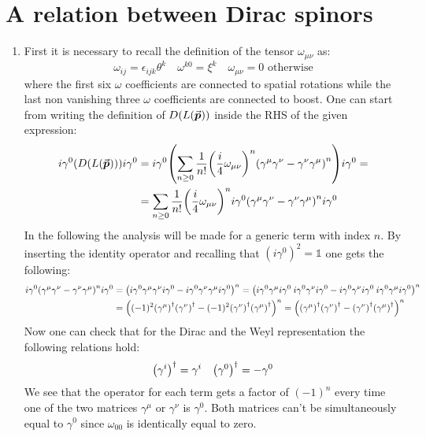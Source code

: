 \documentclass[11pt, oneside]{article}   	%
\begin{document}
\section{A relation between Dirac spinors}

\begin{enumerate}[label=\alph*)]

\item First it is necessary to recall the definition of the tensor $\omega_{\mu\nu}$ as:
\[
	\omega_{i j} = \epsilon_{ijk} \theta^k \quad \omega^{k0} = \xi^k \quad \omega_{\mu\nu} = 0 \text{ otherwise}
\]
where the first six $\omega$ coefficients are connected to spatial rotations while the last non vanishing three $\omega$ coefficients are connected to boost.
One can start from writing the definition of $D(L(\va*{p}))$ inside the RHS of the given expression:
\begin{align*}
	i\gamma^0 \qty( D\qty(L(\va*{p}))) i\gamma^0 &= i\gamma^0 \qty(\sum_{n\ge0} \frac{1}{n!} \qty(\frac{i}{4} \omega_{\mu\nu})^n \qty(\gamma^\mu \gamma^\nu -\gamma^\nu \gamma^\mu)^n ) i \gamma^0 = \\
	& = \sum_{n\ge0} \frac{1}{n!} \qty(\frac{i}{4} \omega_{\mu\nu})^ni\gamma^0 \qty(\gamma^\mu \gamma^\nu -\gamma^\nu \gamma^\mu)^n i \gamma^0
\end{align*}
In the following the analysis will be made for a generic term with index $n$. By inserting the identity operator and recalling that $(i\gamma^0)^2 = \mathds{1}$ one gets the following:
\begin{align*}
	i\gamma^0 \qty(\gamma^\mu \gamma^\nu -\gamma^\nu \gamma^\mu)^n i \gamma^0 &= \qty( i\gamma^0 \gamma^\mu \gamma^\nu i\gamma^0  - i\gamma^0 \gamma^\nu \gamma^\mu i\gamma^0 )^n = \qty( i\gamma^0 \gamma^\mu i\gamma^0 \: i\gamma^0 \gamma^\nu i\gamma^0  - i\gamma^0 \gamma^\nu i\gamma^0\: i\gamma^0 \gamma^\mu i\gamma^0 )^n \\
	& = \qty( (-1)^2\qty(\gamma^\mu)^\dagger \qty(\gamma^\nu)^\dagger - (-1)^2\qty(\gamma^\nu)^\dagger \qty(\gamma^\mu)^\dagger )^n = \qty( \qty(\gamma^\mu)^\dagger \qty(\gamma^\nu)^\dagger - \qty(\gamma^\nu)^\dagger \qty(\gamma^\mu)^\dagger )^n
\end{align*}
Now one can check that for the Dirac and the Weyl representation the following relations hold:
\[
	\qty(\gamma^i)^\dagger = \gamma^i \quad \qty(\gamma^0)^\dagger = - \gamma^0
\]
We see that the operator for each term gets a factor of $(-1)^n$ every time one of the two matrices $\gamma^\mu$ or $\gamma^\nu$ is $\gamma^0$. Both matrices can't be simultaneously equal to $\gamma^0$ since $\omega_{00}$ is identically equal to zero.


\end{enumerate}
\end{document}
